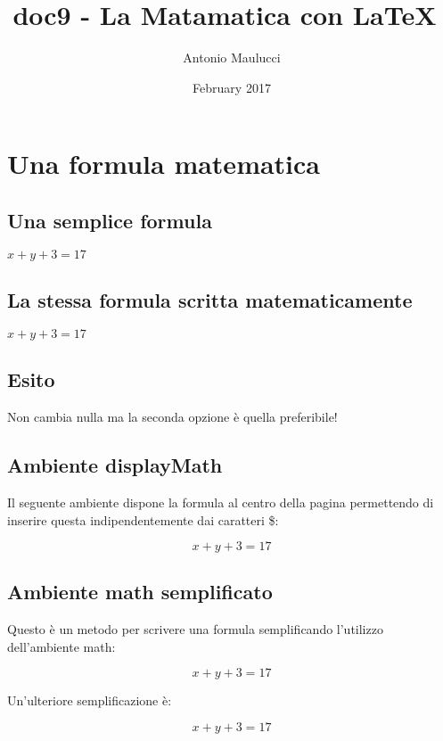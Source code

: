 \documentclass[a4paper]{article}
\title{doc9 - La Matamatica con \LaTeX\ }
\author{Antonio Maulucci}
\date{February 2017}
\begin{document}
\maketitle

\section{Una formula matematica}
\subsection{Una semplice formula}

\( x+y+3=17 \)

\subsection{La stessa formula scritta matematicamente}

$ x + y +3 = 17 $ %

\subsection{Esito}

Non cambia nulla ma la seconda opzione è quella preferibile!

\subsection{Ambiente displayMath}


Il seguente ambiente dispone la formula al centro della pagina permettendo di inserire questa indipendentemente dai caratteri \$:

\begin{displaymath}
x + y + 3 = 17
\end{displaymath}

\subsection{Ambiente math semplificato}

Questo è un metodo per scrivere una formula semplificando l'utilizzo dell'ambiente math:

\[ x+ y +3 = 17 \]

Un'ulteriore semplificazione è:

$$x + y +3 = 17$$
\end{document}
